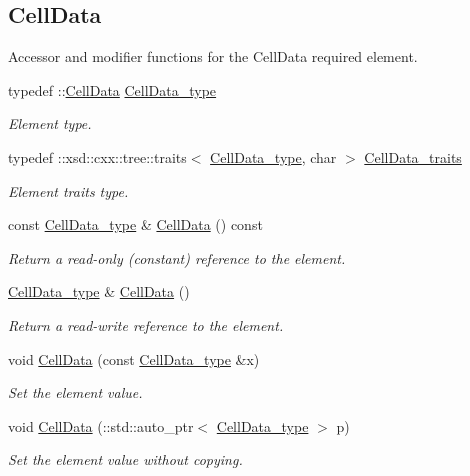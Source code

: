 \subsection*{Cell\+Data}
\label{_amgrp007b3d9997e1a909fe32a9f90c4a9977}%
Accessor and modifier functions for the Cell\+Data required element. \begin{DoxyCompactItemize}
\item 
typedef \+::\hyperlink{classCellData}{Cell\+Data} \hyperlink{classPieceUnstructuredGrid__t_a4232a7b88477ee6f692a4e5fab6a65d1}{Cell\+Data\+\_\+type}
\begin{DoxyCompactList}\small\item\em Element type. \end{DoxyCompactList}\item 
typedef \+::xsd\+::cxx\+::tree\+::traits$<$ \hyperlink{classPieceUnstructuredGrid__t_a4232a7b88477ee6f692a4e5fab6a65d1}{Cell\+Data\+\_\+type}, char $>$ \hyperlink{classPieceUnstructuredGrid__t_a0e04d369c16993da7e5e2a7152c2e518}{Cell\+Data\+\_\+traits}
\begin{DoxyCompactList}\small\item\em Element traits type. \end{DoxyCompactList}\item 
const \hyperlink{classPieceUnstructuredGrid__t_a4232a7b88477ee6f692a4e5fab6a65d1}{Cell\+Data\+\_\+type} \& \hyperlink{classPieceUnstructuredGrid__t_a7c7be2b175fa0ec2fc403bb4740865c1}{Cell\+Data} () const 
\begin{DoxyCompactList}\small\item\em Return a read-\/only (constant) reference to the element. \end{DoxyCompactList}\item 
\hyperlink{classPieceUnstructuredGrid__t_a4232a7b88477ee6f692a4e5fab6a65d1}{Cell\+Data\+\_\+type} \& \hyperlink{classPieceUnstructuredGrid__t_a679db045d830876cce6fe04767e7c611}{Cell\+Data} ()
\begin{DoxyCompactList}\small\item\em Return a read-\/write reference to the element. \end{DoxyCompactList}\item 
void \hyperlink{classPieceUnstructuredGrid__t_a6fd0984f28544ef312e860cac18e7144}{Cell\+Data} (const \hyperlink{classPieceUnstructuredGrid__t_a4232a7b88477ee6f692a4e5fab6a65d1}{Cell\+Data\+\_\+type} \&x)
\begin{DoxyCompactList}\small\item\em Set the element value. \end{DoxyCompactList}\item 
void \hyperlink{classPieceUnstructuredGrid__t_af669b0f503d52e5edc2cc0665dc64721}{Cell\+Data} (\+::std\+::auto\+\_\+ptr$<$ \hyperlink{classPieceUnstructuredGrid__t_a4232a7b88477ee6f692a4e5fab6a65d1}{Cell\+Data\+\_\+type} $>$ p)
\begin{DoxyCompactList}\small\item\em Set the element value without copying. \end{DoxyCompactList}\end{DoxyCompactItemize}
